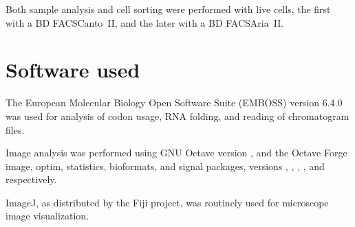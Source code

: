       Both sample analysis and cell sorting were performed with live cells, the
      first with a BD FACSCanto~II, and the later with a BD FACSAria~II.

  \section{Software used}
    \label{sec:methods:software}
    The European Molecular Biology Open Software Suite (EMBOSS) version 6.4.0
    was used for analysis of codon usage, RNA folding, and reading of
    chromatogram files.

    Image analysis was performed using GNU Octave version \OctaveVersion{},
    and the Octave Forge image, optim, statistics, bioformats, and signal
    packages, versions \OctaveImageVersion{}, \OctaveOptimVersion{},
    \OctaveStatisticsVersion{}, \OctaveBioformatsVersion{}, and
    \OctaveSignalVersion{} respectively.

    ImageJ, as distributed by the Fiji project, was routinely used
    for microscope image visualization.
